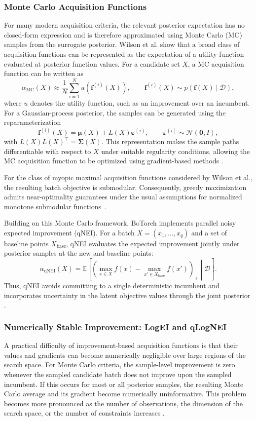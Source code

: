 \subsubsection{Monte Carlo Acquisition Functions}
For many modern acquisition criteria, the relevant posterior expectation has no closed-form expression and is therefore approximated using Monte Carlo (MC) samples from the surrogate posterior. Wilson et al. \cite{wilson2018maximizing} show that a broad class of acquisition functions can be represented as the expectation of a utility function evaluated at posterior function values. For a candidate set $X$, a MC acquisition function can be written as
\[
\alpha_{\mathrm{MC}}(X)
\approx
\frac{1}{N}\sum_{i=1}^{N}
u\!\left(\mathbf f^{(i)}(X)\right),
\qquad
\mathbf f^{(i)}(X)
\sim
p\!\left(\mathbf f(X)\mid\mathcal{D}\right),
\]
where $u$ denotes the utility function, such as an improvement over an
incumbent. For a Gaussian-process posterior, the samples can be generated
using the reparameterization
\[
\mathbf f^{(i)}(X)
=
\boldsymbol{\mu}(X)
+
L(X)\boldsymbol{\varepsilon}^{(i)},
\qquad
\boldsymbol{\varepsilon}^{(i)}\sim\mathcal{N}(\mathbf{0},I),
\]
with $L(X)L(X)^\top=\boldsymbol{\Sigma}(X)$. This representation makes the sample paths differentiable with respect to $X$ under suitable regularity conditions, allowing the MC acquisition function to be optimized using gradient-based methods \cite{wilson2018maximizing,balandat2019botorch}.

For the class of myopic maximal acquisition functions considered by Wilson et al., the resulting batch objective is submodular. Consequently, greedy maximization admits near-optimality guarantees under the usual assumptions for normalized monotone submodular functions~\cite{wilson2018maximizing}.

Building on this Monte Carlo framework, BoTorch implements parallel noisy expected improvement (qNEI). For a batch $X=(x_1,\ldots,x_q)$ and a set of baseline points $X_{\mathrm{base}}$, qNEI evaluates the expected improvement jointly under posterior samples at the new and baseline points:
\[
\alpha_{\mathrm{qNEI}}(X)
=
\mathbb{E}\left[
\left(
\max_{x\in X} f(x)
-
\max_{x'\in X_{\mathrm{base}}}f(x')
\right)_+
\middle|\mathcal{D}
\right].
\]
Thus, qNEI avoids committing to a single deterministic incumbent and
incorporates uncertainty in the latent objective values through the joint
posterior \cite{balandat2019botorch}.

\subsubsection{Numerically Stable Improvement: LogEI and qLogNEI}
A practical difficulty of improvement-based acquisition functions is that their values and gradients can become numerically negligible over large regions of the search space. For Monte Carlo criteria, the sample-level improvement is zero whenever the sampled candidate batch does not improve upon the sampled incumbent. If this occurs for most or all posterior samples, the resulting Monte Carlo average and its gradient become numerically uninformative. This problem becomes more pronounced as the number of observations, the dimension of the search space, or the number of constraints increases \cite{ament2023unexpected}.

